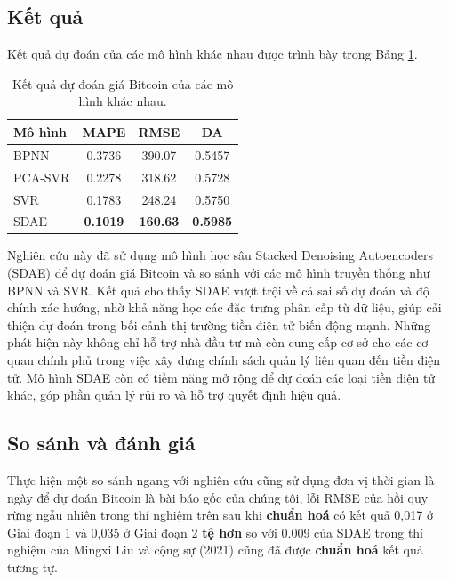 \subsection{Kết quả}

Kết quả dự đoán của các mô hình khác nhau được trình bày trong Bảng \ref{table:results}.

\begin{table}[h]
    \centering
    \begin{tabular}{|l|c|c|c|}
        \hline
        \textbf{Mô hình} & \textbf{MAPE} & \textbf{RMSE} & \textbf{DA} \\
        \hline
        BPNN & 0.3736 & 390.07 & 0.5457 \\
        PCA-SVR & 0.2278 & 318.62 & 0.5728 \\
        SVR & 0.1783 & 248.24 & 0.5750 \\
        SDAE & \textbf{0.1019} & \textbf{160.63} & \textbf{0.5985} \\
        \hline
    \end{tabular}
    \caption{Kết quả dự đoán giá Bitcoin của các mô hình khác nhau.}
    \label{table:results}
\end{table}

Nghiên cứu này đã sử dụng mô hình học sâu Stacked Denoising Autoencoders (SDAE) để dự đoán giá Bitcoin và so sánh với các mô hình truyền thống như BPNN và SVR. Kết quả cho thấy SDAE vượt trội về cả sai số dự đoán và độ chính xác hướng, nhờ khả năng học các đặc trưng phân cấp từ dữ liệu, giúp cải thiện dự đoán trong bối cảnh thị trường tiền điện tử biến động mạnh. Những phát hiện này không chỉ hỗ trợ nhà đầu tư mà còn cung cấp cơ sở cho các cơ quan chính phủ trong việc xây dựng chính sách quản lý liên quan đến tiền điện tử. Mô hình SDAE còn có tiềm năng mở rộng để dự đoán các loại tiền điện tử khác, góp phần quản lý rủi ro và hỗ trợ quyết định hiệu quả.
\subsection{So sánh và đánh giá}

Thực hiện một so sánh ngang với nghiên cứu cũng sử dụng đơn vị thời gian là ngày để dự đoán Bitcoin là bài báo gốc của chúng tôi, lỗi RMSE của hồi quy rừng ngẫu nhiên trong thí nghiệm trên sau khi \textbf{chuẩn hoá} có kết quả 0,017 ở Giai đoạn 1 và 0,035 ở Giai đoạn 2 \textbf{tệ hơn} so với 0.009 của SDAE trong thí nghiệm của Mingxi Liu và cộng sự (2021) \cite{6} cũng đã được \textbf{chuẩn hoá} kết quả tương tự.

